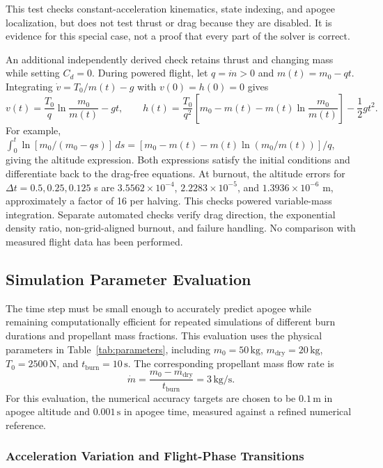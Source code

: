 \documentclass{article}
\begin{document}
This test checks constant-acceleration kinematics, state indexing, and apogee localization, but does not test thrust or drag because they are disabled. It is evidence for this special case, not a proof that every part of the solver is correct.

An additional independently derived check retains thrust and changing mass while setting $C_d=0$. During powered flight, let $q=\dot m>0$ and $m(t)=m_0-qt$. Integrating $\dot v=T_0/m(t)-g$ with $v(0)=h(0)=0$ gives
\[
v(t)=\frac{T_0}{q}\ln\frac{m_0}{m(t)}-gt,
\qquad
h(t)=\frac{T_0}{q^2}\left[m_0-m(t)-m(t)\ln\frac{m_0}{m(t)}\right]-\frac12gt^2.
\]
For example, $\int_0^t\ln[m_0/(m_0-qs)]\,ds=[m_0-m(t)-m(t)\ln(m_0/m(t))]/q$, giving the altitude expression. Both expressions satisfy the initial conditions and differentiate back to the drag-free equations. At burnout, the altitude errors for $\Delta t=0.5,0.25,0.125$ s are $3.5562\times10^{-4}$, $2.2283\times10^{-5}$, and $1.3936\times10^{-6}$ m, approximately a factor of 16 per halving. This checks powered variable-mass integration. Separate automated checks verify drag direction, the exponential density ratio, non-grid-aligned burnout, and failure handling. No comparison with measured flight data has been performed.

\subsection{Simulation Parameter Evaluation}%

The time step must be small enough to accurately predict apogee while
remaining computationally efficient for repeated simulations of different
burn durations and propellant mass fractions. This evaluation uses the
physical parameters in Table~\ref{tab:parameters}, including
$m_0=50\,\mathrm{kg}$, $m_{\mathrm{dry}}=20\,\mathrm{kg}$,
$T_0=2500\,\mathrm{N}$, and $t_{\mathrm{burn}}=10\,\mathrm{s}$.
The corresponding propellant mass flow rate is
\[
\dot{m}=\frac{m_0-m_{\mathrm{dry}}}{t_{\mathrm{burn}}}
       =3\,\mathrm{kg/s}.
\]
For this evaluation, the numerical accuracy targets are chosen to be
$0.1\,\mathrm{m}$ in apogee altitude and $0.001\,\mathrm{s}$ in
apogee time, measured against a refined numerical reference.

\subsubsection{Acceleration Variation and Flight-Phase Transitions}
\end{document}
